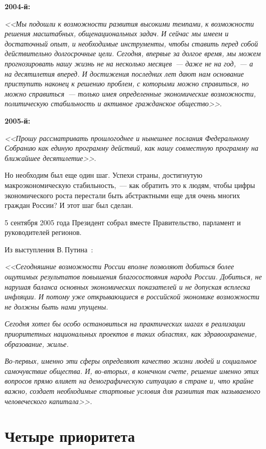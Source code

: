 \documentclass[article, 12pt, russian, oneside]{ncc}
\begin{document}
\textbf{2004-й:}

\emph{<<Мы подошли к возможности развития высокими темпами, к
  возможности решения масштабных, общенациональных задач. И сейчас мы
  имеем и достаточный опыт, и необходимые инструменты, чтобы ставить
  перед собой действительно долгосрочные цели. Сегодня, впервые за
  долгое время, мы можем прогнозировать нашу жизнь не на несколько
  месяцев~--- даже не на год,~--- а на десятилетия вперед. И
  достижения последних лет дают нам основание приступить наконец к
  решению проблем, с которыми можно справиться, но можно
  справиться~--- только имея определенные экономические возможности,
  политическую стабильность и активное гражданское общество>>}\cite{Putin_2004}.

\textbf{2005-й:}

\emph{<<Прошу рассматривать прошлогоднее и нынешнее послания
  Федеральному Собранию как единую программу действий, как нашу
  совместную программу на ближайшее десятилетие>>}\cite{Putin_2005}.

Но необходим был еще один шаг. Успехи страны, достигнутую
макроэкономическую стабильность,~--- как обратить это к людям, чтобы
цифры экономического роста перестали быть абстрактными еще для очень
многих граждан России? И этот шаг был сделан.

5 сентября 2005 года Президент собрал вместе Правительство, парламент
и руководителей регионов.

Из выступления В.\,Путина~\cite{Putin_Gov}:

\emph{<<Сегодняшние возможности России вполне позволяют добиться более
  ощутимых результатов повышения благосостояния народа
  России. Добиться, не нарушая баланса основных экономических
  показателей и не допуская всплеска инфляции. И потому уже
  открывающиеся в российской экономике возможности не должны быть нами
  упущены.}
    
\emph{Сегодня хотел бы особо остановиться на практических шагах в
  реализации приоритетных национальных проектов в таких областях, как
  здравоохранение, образование, жилье.}

\emph{Во-первых, именно эти сферы определяют качество жизни людей и
  социальное самочувствие общества. И, во-вторых, в конечном счете,
  решение именно этих вопросов прямо влияет на демографическую
  ситуацию в стране и, что крайне важно, создает необходимые стартовые
  условия для развития так называемого человеческого капитала>>.}
\newpage


\section{Четыре приоритета}
\end{document}
